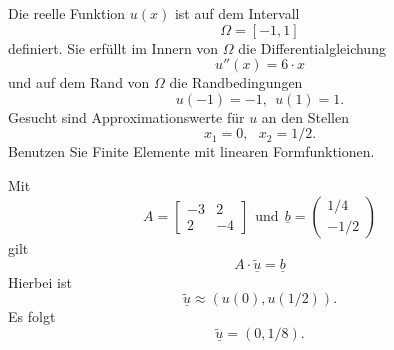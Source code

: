 Die reelle Funktion $u(x)$ ist auf dem Intervall
\[
\Omega = [-1, 1]
\]
definiert. Sie erfüllt im Innern von $\Omega$ die Differentialgleichung 
\[
u''(x) = 6 \cdot x
\]
und auf dem Rand von $\Omega$ die Randbedingungen 
\[
u(-1) = -1, \ \ u(1) = 1.
\]
Gesucht sind Approximationswerte für $u$ an den Stellen
\[
x_1 = 0, \ \ \  x_2 = 1/2.
\]
Benutzen Sie Finite Elemente mit linearen Formfunktionen.

\begin{loesung}
Mit
\[
A = \left[\begin{array}{rr} -3 & 2 \\ 2 & -4  \end{array}\right] \ \ \text{und} \ \
  \underline{b} =  \left(\begin{array}{r} 1/4 \\ -1/2 \end{array}\right)
\]
gilt  
\[
A \cdot \underline{\tilde u} = \underline{b}
\]
Hierbei ist
\[
\underline{\tilde u} \approx (u(0), u(1/2)).
\]
Es folgt 
\[
\underline{\tilde u} = (0, 1/8).
\]
\end{loesung}

